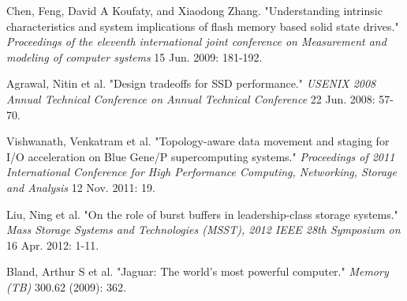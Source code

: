 \documentclass[letterpaper, 10pt]{article}
\begin{document}
\begin{small}
\begin{footnotesize}

\begin{thebibliography}{}


Chen, Feng, David A Koufaty, and Xiaodong Zhang. "Understanding intrinsic
characteristics and system implications of flash memory based solid state
drives."
{\it Proceedings of the eleventh international joint conference on
Measurement and modeling of computer systems} 15 Jun. 2009: 181-192.

Agrawal, Nitin et al. "Design tradeoffs for SSD performance."
{\it USENIX 2008 Annual Technical Conference on Annual Technical Conference}
22 Jun. 2008: 57-70.

Vishwanath, Venkatram et al. "Topology-aware data movement and staging for I/O
acceleration on Blue Gene/P supercomputing systems."
{\it Proceedings of 2011
International Conference for High Performance Computing, Networking, Storage
and Analysis} 12 Nov. 2011: 19.

Liu, Ning et al. "On the role of burst buffers in leadership-class storage
systems."
{\it Mass Storage Systems and Technologies (MSST), 2012 IEEE 28th
Symposium on} 16 Apr. 2012: 1-11.

Bland, Arthur S et al. "Jaguar: The world’s most powerful computer."
{\it Memory (TB)} 300.62 (2009): 362.





\end{thebibliography}
\end{footnotesize}
\end{small}
\end{document}
